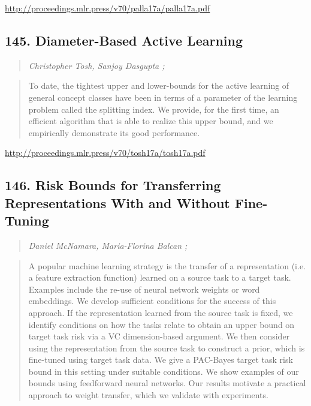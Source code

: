 \documentclass{article}
\begin{document}
\href{http://proceedings.mlr.press/v70/palla17a/palla17a.pdf}{http://proceedings.mlr.press/v70/palla17a/palla17a.pdf}

\subsection{145. Diameter-Based Active Learning}

\begin{quote}
\footnotesize{\textit{Christopher Tosh, Sanjoy Dasgupta ;}}
\end{quote}

\begin{quote}
    To date, the tightest upper and lower-bounds for the active learning of general concept classes have been in terms of a parameter of the learning problem called the splitting index. We provide, for the first time, an efficient algorithm that is able to realize this upper bound, and we empirically demonstrate its good performance.  \end{quote}

\href{http://proceedings.mlr.press/v70/tosh17a/tosh17a.pdf}{http://proceedings.mlr.press/v70/tosh17a/tosh17a.pdf}

\subsection{146. Risk Bounds for Transferring Representations With and Without Fine-Tuning}

\begin{quote}
\footnotesize{\textit{Daniel McNamara, Maria-Florina Balcan ;}}
\end{quote}

\begin{quote}
    A popular machine learning strategy is the transfer of a representation (i.e. a feature extraction function) learned on a source task to a target task. Examples include the re-use of neural network weights or word embeddings. We develop sufficient conditions for the success of this approach. If the representation learned from the source task is fixed, we identify conditions on how the tasks relate to obtain an upper bound on target task risk via a VC dimension-based argument. We then consider using the representation from the source task to construct a prior, which is fine-tuned using target task data. We give a PAC-Bayes target task risk bound in this setting under suitable conditions. We show examples of our bounds using feedforward neural networks. Our results motivate a practical approach to weight transfer, which we validate with experiments.  \end{quote}
\end{document}

